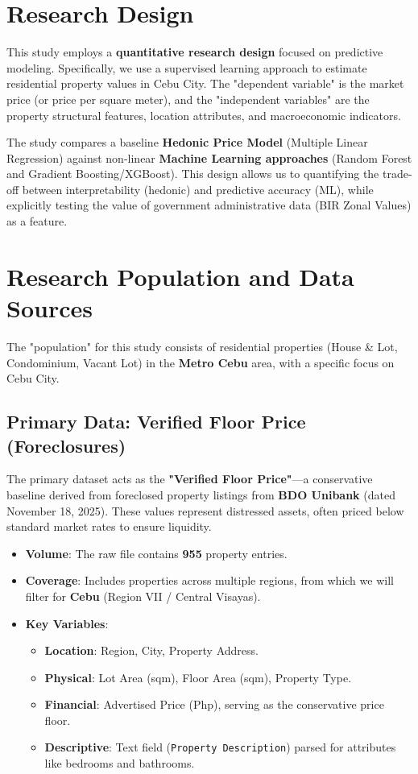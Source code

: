 \section{Research Design}

This study employs a \textbf{quantitative research design} focused on predictive modeling. Specifically, we use a supervised learning approach to estimate residential property values in Cebu City. The "dependent variable" is the market price (or price per square meter), and the "independent variables" are the property structural features, location attributes, and macroeconomic indicators.

The study compares a baseline \textbf{Hedonic Price Model} (Multiple Linear Regression) against non-linear \textbf{Machine Learning approaches} (Random Forest and Gradient Boosting/XGBoost). This design allows us to quantifying the trade-off between interpretability (hedonic) and predictive accuracy (ML), while explicitly testing the value of government administrative data (BIR Zonal Values) as a feature.

\section{Research Population and Data Sources}

The "population" for this study consists of residential properties (House \& Lot, Condominium, Vacant Lot) in the \textbf{Metro Cebu} area, with a specific focus on Cebu City.

\subsection{Primary Data: Verified Floor Price (Foreclosures)}

The primary dataset acts as the \textbf{"Verified Floor Price"}—a conservative baseline derived from foreclosed property listings from \textbf{BDO Unibank} (dated November 18, 2025). These values represent distressed assets, often priced below standard market rates to ensure liquidity.

\begin{itemize}
    \item \textbf{Volume}: The raw file contains \textbf{955} property entries.
    \item \textbf{Coverage}: Includes properties across multiple regions, from which we will filter for \textbf{Cebu} (Region VII / Central Visayas).
    \item \textbf{Key Variables}:
    \begin{itemize}
        \item \textbf{Location}: Region, City, Property Address.
        \item \textbf{Physical}: Lot Area (sqm), Floor Area (sqm), Property Type.
        \item \textbf{Financial}: Advertised Price (Php), serving as the conservative price floor.
        \item \textbf{Descriptive}: Text field (\texttt{Property Description}) parsed for attributes like bedrooms and bathrooms.
    \end{itemize}
\end{itemize}

